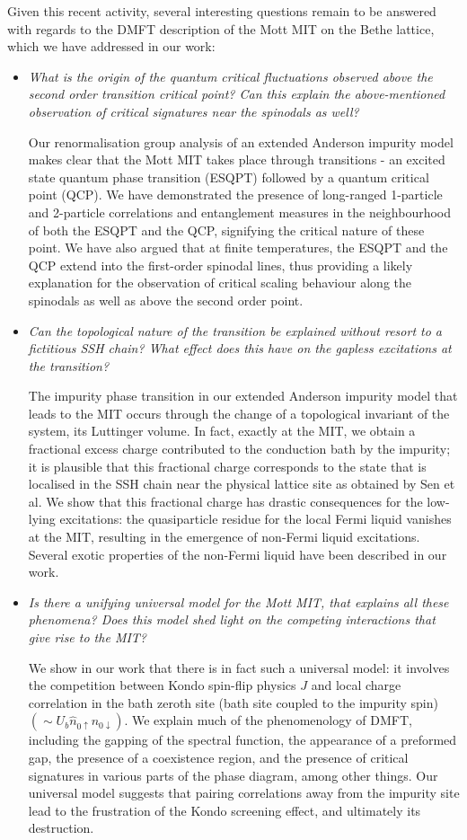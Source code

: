 \documentclass{article}
\begin{document}
Given this recent activity, several interesting questions remain to be answered with regards to the DMFT description of the Mott MIT on the Bethe lattice, which we have addressed in our work:
\begin{itemize}
	\item {\it What is the origin of the quantum critical fluctuations observed above the second order transition critical point? Can this explain the above-mentioned observation of critical signatures near the spinodals as well?}
\par
Our renormalisation group analysis of an extended Anderson impurity model makes clear that the Mott MIT takes place through transitions - an excited state quantum phase transition (ESQPT) followed by a quantum critical point (QCP). We have demonstrated the presence of long-ranged 1-particle and 2-particle correlations and entanglement measures in the neighbourhood of both the ESQPT and the QCP, signifying the critical nature of these point. We have also argued that at finite temperatures, the ESQPT and the QCP extend into the first-order spinodal lines, thus providing a likely explanation for the observation of critical scaling behaviour along the spinodals as well as above the second order point.
\item
	{\it Can the topological nature of the transition be explained without resort to a fictitious SSH chain? What effect does this have on the gapless excitations at the transition?}
\par
The impurity phase transition in our extended Anderson impurity model that leads to the MIT occurs through the change of a topological invariant of the system, its Luttinger volume. In fact, exactly at the MIT, we obtain a fractional excess charge contributed to the conduction bath by the impurity; it is plausible that this fractional charge corresponds to the state that is localised in the SSH chain near the physical lattice site as obtained by Sen et al. We show that this fractional charge has drastic consequences for the low-lying excitations: the quasiparticle residue for the local Fermi liquid vanishes at the MIT, resulting in the emergence of non-Fermi liquid excitations. Several exotic properties of the non-Fermi liquid have been described in our work.
\item
	{\it Is there a unifying universal model for the Mott MIT, that explains all these phenomena? Does this model shed light on the competing interactions that give rise to the MIT?}
\par
We show in our work that there is in fact such a universal model: it involves the competition between Kondo spin-flip physics \(J\) and local charge correlation in the bath zeroth site (bath site coupled to the impurity spin) \(\left( \sim U_b\hat n_{0 \uparrow}n_{0 \downarrow} \right) \). We explain much of the phenomenology of DMFT, including the gapping of the spectral function, the appearance of a preformed gap, the presence of a coexistence region, and the presence of critical signatures in various parts of the phase diagram, among other things. Our universal model suggests that pairing correlations away from the impurity site lead to the frustration of the Kondo screening effect, and ultimately its destruction.
\end{itemize}


\end{document}
